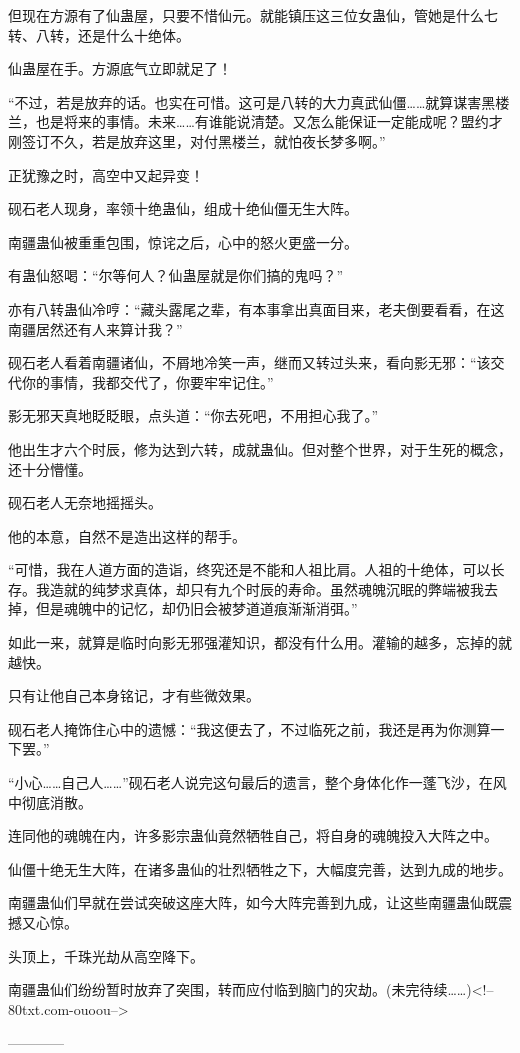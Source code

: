 \begin{this_body}
但现在方源有了仙蛊屋，只要不惜仙元。就能镇压这三位女蛊仙，管她是什么七转、八转，还是什么十绝体。

仙蛊屋在手。方源底气立即就足了！

“不过，若是放弃的话。也实在可惜。这可是八转的大力真武仙僵……就算谋害黑楼兰，也是将来的事情。未来……有谁能说清楚。又怎么能保证一定能成呢？盟约才刚签订不久，若是放弃这里，对付黑楼兰，就怕夜长梦多啊。”

正犹豫之时，高空中又起异变！

砚石老人现身，率领十绝蛊仙，组成十绝仙僵无生大阵。

南疆蛊仙被重重包围，惊诧之后，心中的怒火更盛一分。

有蛊仙怒喝：“尔等何人？仙蛊屋就是你们搞的鬼吗？”

亦有八转蛊仙冷哼：“藏头露尾之辈，有本事拿出真面目来，老夫倒要看看，在这南疆居然还有人来算计我？”

砚石老人看着南疆诸仙，不屑地冷笑一声，继而又转过头来，看向影无邪：“该交代你的事情，我都交代了，你要牢牢记住。”

影无邪天真地眨眨眼，点头道：“你去死吧，不用担心我了。”

他出生才六个时辰，修为达到六转，成就蛊仙。但对整个世界，对于生死的概念，还十分懵懂。

砚石老人无奈地摇摇头。

他的本意，自然不是造出这样的帮手。

“可惜，我在人道方面的造诣，终究还是不能和人祖比肩。人祖的十绝体，可以长存。我造就的纯梦求真体，却只有九个时辰的寿命。虽然魂魄沉眠的弊端被我去掉，但是魂魄中的记忆，却仍旧会被梦道道痕渐渐消弭。”

如此一来，就算是临时向影无邪强灌知识，都没有什么用。灌输的越多，忘掉的就越快。

只有让他自己本身铭记，才有些微效果。

砚石老人掩饰住心中的遗憾：“我这便去了，不过临死之前，我还是再为你测算一下罢。”

“小心……自己人……”砚石老人说完这句最后的遗言，整个身体化作一蓬飞沙，在风中彻底消散。

连同他的魂魄在内，许多影宗蛊仙竟然牺牲自己，将自身的魂魄投入大阵之中。

仙僵十绝无生大阵，在诸多蛊仙的壮烈牺牲之下，大幅度完善，达到九成的地步。

南疆蛊仙们早就在尝试突破这座大阵，如今大阵完善到九成，让这些南疆蛊仙既震撼又心惊。

头顶上，千珠光劫从高空降下。

南疆蛊仙们纷纷暂时放弃了突围，转而应付临到脑门的灾劫。(未完待续……)<!--80txt.com-ouoou-->

------------

\end{this_body}

